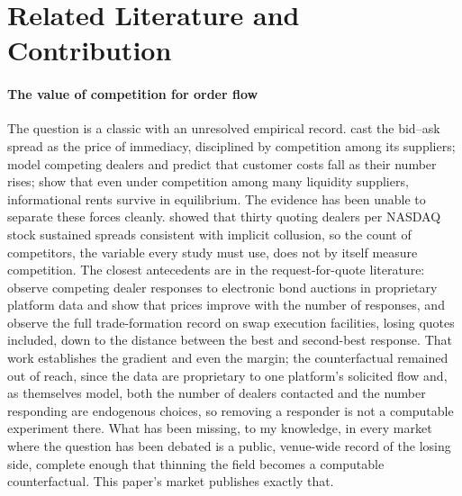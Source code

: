 \documentclass[11pt]{article}
\theoremstyle{plain}
\theoremstyle{definition}
\theoremstyle{remark}
\begin{document}
\section{Related Literature and Contribution}

\paragraph{The value of competition for order flow} The question is a classic with an unresolved empirical record. \citet{demsetz1968cost} cast the bid--ask spread as the price of immediacy, disciplined by competition among its suppliers; \citet{ho1983dynamics} model competing dealers and predict that customer costs fall as their number rises; \citet{biais2000competing} show that even under competition among many liquidity suppliers, informational rents survive in equilibrium. The evidence has been unable to separate these forces cleanly. \citet{christie1994nasdaq} showed that thirty quoting dealers per NASDAQ stock sustained spreads consistent with implicit collusion, so the count of competitors, the variable every study must use, does not by itself measure competition. The closest antecedents are in the request-for-quote literature: \citet{hendershott2015click} observe competing dealer responses to electronic bond auctions in proprietary platform data and show that prices improve with the number of responses, and \citet{riggs2020swap} observe the full trade-formation record on swap execution facilities, losing quotes included, down to the distance between the best and second-best response. That work establishes the gradient and even the margin; the counterfactual remained out of reach, since the data are proprietary to one platform's solicited flow and, as \citet{hendershott2015click} themselves model, both the number of dealers contacted and the number responding are endogenous choices, so removing a responder is not a computable experiment there. What has been missing, to my knowledge, in every market where the question has been debated is a public, venue-wide record of the losing side, complete enough that thinning the field becomes a computable counterfactual. This paper's market publishes exactly that.
\end{document}
